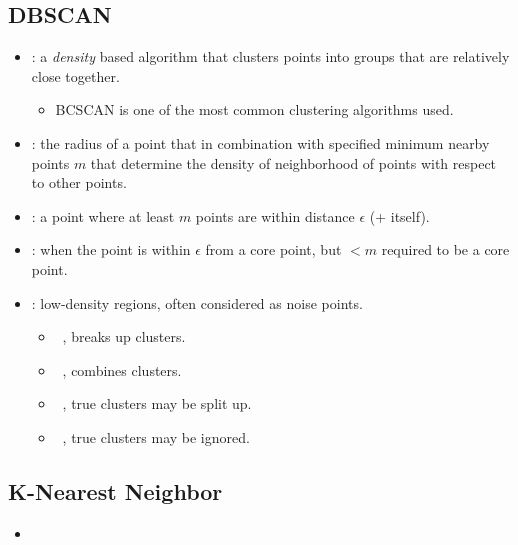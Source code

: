 \begin{itemize}
  \subsection{DBSCAN}
  \begin{itemize}
    \item {}: a \emph{density} based \hyperref[Subsection: Parametric vs. Nonparametric]{} algorithm that clusters points into groups that are relatively close together.
      \begin{itemize}
        \item BCSCAN is one of the most common clustering algorithms used.
      \end{itemize}
    \item {}: the radius of a point that in combination with specified minimum nearby points \(m\) that determine the density of neighborhood of points with respect to other points.
    \item {}: a point where at least \(m\) points are within distance \(\epsilon \) (+ itself).
    \item {}: when the point is within \(\epsilon \) from a core point, but \(< m\) required to be a core point.
    \item {}: low-density regions, often considered as noise points.
      \begin{center}
      \end{center}
    \medskip
      \begin{itemize}
        \item {} \to~, breaks up clusters.
        \item {} \to~, combines clusters.
        \item {} \to~, true clusters may be split up.
        \item {} \to~, true clusters may be ignored.
      \end{itemize}
  \end{itemize}

  \subsection{K-Nearest Neighbor}
  \begin{itemize}
    \item 
  \end{itemize}
  
\end{itemize}

